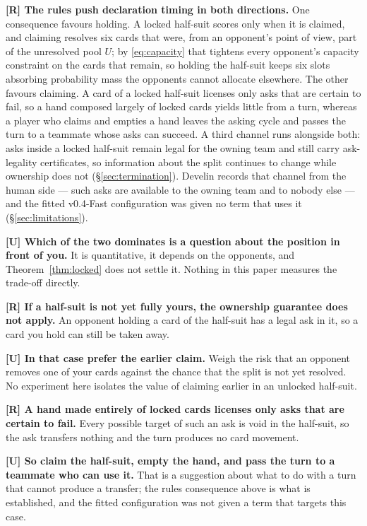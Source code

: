 \documentclass[11pt]{article}
\theoremstyle{definition}
\DeclareRobustCommand{\vfast}{\texorpdfstring{\mbox{v0.4-Fast}}{v0.4-Fast}}
\begin{document}
\textbf{[R] The rules push declaration timing in both directions.} One
consequence favours holding. A locked half-suit scores only when it is claimed,
and claiming resolves six cards that were, from an opponent's point of view,
part of the unresolved pool $U$; by \eqref{eq:capacity} that tightens every
opponent's capacity constraint on the cards that remain, so holding the
half-suit keeps six slots absorbing probability mass the opponents cannot
allocate elsewhere. The other favours claiming. A card of a locked half-suit
licenses only asks that are certain to fail, so a hand composed largely of
locked cards yields little from a turn, whereas a player who claims and empties
a hand leaves the asking cycle and passes the turn to a teammate whose asks can
succeed. A third channel runs alongside both: asks inside a
locked half-suit remain legal for the owning team and still carry ask-legality
certificates, so information about the split continues to change while ownership
does not (\S\ref{sec:termination}). Develin \cite{develin} records that
channel from the human side --- such asks are available to the owning team and
to nobody else --- and the fitted \vfast{} configuration was given no term that
uses it (\S\ref{sec:limitations}).

\textbf{[U] Which of the two dominates is a question about the position in
front of you.} It is quantitative, it depends on the opponents, and
Theorem~\ref{thm:locked} does not settle it. Nothing in this paper measures the
trade-off directly.

\textbf{[R] If a half-suit is not yet fully yours, the ownership guarantee does
not apply.} An opponent holding a card of the half-suit has a legal ask in it,
so a card you hold can still be taken away.

\textbf{[U] In that case prefer the earlier claim.} Weigh the risk that an
opponent removes one of your cards against the chance that the split is not yet
resolved. No experiment here isolates the value of claiming earlier in an
unlocked half-suit.

\textbf{[R] A hand made entirely of locked cards licenses only asks that are
certain to fail.} Every possible target of such an ask is void in the half-suit,
so the ask transfers nothing and the turn produces no card movement.

\textbf{[U] So claim the half-suit, empty the hand, and pass the turn to a
teammate who can use it.} That is a suggestion about what to do with a turn
that cannot produce a transfer; the rules consequence above is what is
established, and the fitted configuration was not given a term that targets this
case.
\end{document}
